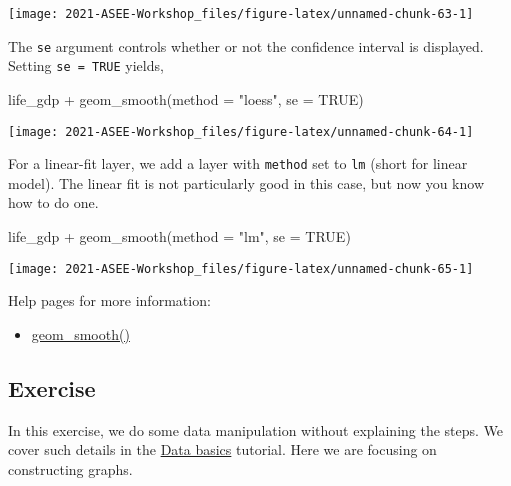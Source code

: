 \documentclass[
]{book}
\newenvironment{Shaded}{\begin{snugshade}}{\end{snugshade}}
\newcommand{\AttributeTok}[1]{\textcolor[rgb]{0.77,0.63,0.00}{#1}}
\newcommand{\ConstantTok}[1]{\textcolor[rgb]{0.00,0.00,0.00}{#1}}
\newcommand{\FunctionTok}[1]{\textcolor[rgb]{0.00,0.00,0.00}{#1}}
\newcommand{\NormalTok}[1]{#1}
\newcommand{\SpecialCharTok}[1]{\textcolor[rgb]{0.00,0.00,0.00}{#1}}
\newcommand{\StringTok}[1]{\textcolor[rgb]{0.31,0.60,0.02}{#1}}
\providecommand{\tightlist}{%
  \setlength{\itemsep}{0pt}\setlength{\parskip}{0pt}}
\begin{document}
\texttt{[image: 2021-ASEE-Workshop\_files/figure-latex/unnamed-chunk-63-1]}

The \texttt{se} argument controls whether or not the confidence interval is displayed. Setting \texttt{se\ =\ TRUE} yields,

\begin{Shaded}
\begin{Highlighting}[]
\NormalTok{life\_gdp }\SpecialCharTok{+} 
  \FunctionTok{geom\_smooth}\NormalTok{(}\AttributeTok{method =} \StringTok{"loess"}\NormalTok{, }\AttributeTok{se =} \ConstantTok{TRUE}\NormalTok{)}
\end{Highlighting}
\end{Shaded}

\texttt{[image: 2021-ASEE-Workshop\_files/figure-latex/unnamed-chunk-64-1]}

For a linear-fit layer, we add a layer with \texttt{method} set to \texttt{lm} (short for linear model). The linear fit is not particularly good in this case, but now you know how to do one.

\begin{Shaded}
\begin{Highlighting}[]
\NormalTok{life\_gdp }\SpecialCharTok{+} 
  \FunctionTok{geom\_smooth}\NormalTok{(}\AttributeTok{method =} \StringTok{"lm"}\NormalTok{, }\AttributeTok{se =} \ConstantTok{TRUE}\NormalTok{)}
\end{Highlighting}
\end{Shaded}

\texttt{[image: 2021-ASEE-Workshop\_files/figure-latex/unnamed-chunk-65-1]}

Help pages for more information:

\begin{itemize}
\tightlist
\item
  \href{https://ggplot2.tidyverse.org/reference/geom_smooth.html}{geom\_smooth()}
\end{itemize}

\hypertarget{exercise-2}{%
\subsection{Exercise}\label{exercise-2}}

In this exercise, we do some data manipulation without explaining the steps. We cover such details in the \protect\hyperlink{data-basics}{Data basics} tutorial. Here we are focusing on constructing graphs.
\end{document}
